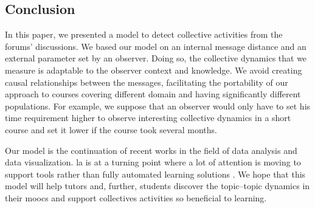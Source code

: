 \documentclass[a4paper,twoside]{article}
\begin{document}
\subsection{Conclusion}
In this paper, we presented a model to detect collective activities from the forums' discussions.  We based our model on an internal message distance and an external parameter set by an observer.  Doing so, the collective dynamics that we measure is adaptable to the observer context and knowledge.  We avoid creating causal relationships between the messages, facilitating the portability of our approach to courses covering different domain and having significantly different populations.  For example, we suppose that an observer would only have to set his time requirement higher to observe interesting collective dynamics in a short course and set it lower if the course took several months.

Our model is the continuation of recent works in the field of data analysis and data visualization.  \gls{la} is at a turning point where a lot of attention is moving to support tools rather than fully automated learning solutions \citep{Kone2018,Baker2016}. We hope that this model will help tutors and, further, students discover the topic--topic dynamics in their \glspl{mooc} and support collectives activities so beneficial to learning.

\vfill 



\small{}

\vfill
\end{document}
